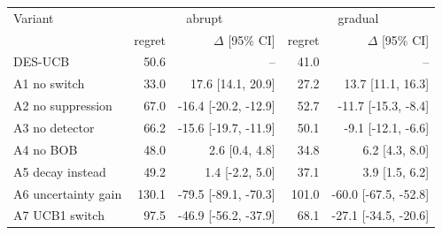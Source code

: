 \begin{tabular}{lrrrr}
\toprule
Variant & \multicolumn{2}{c}{abrupt} & \multicolumn{2}{c}{gradual} \\
 & regret & $\Delta$ [95\% CI] & regret & $\Delta$ [95\% CI] \\
\midrule
DES-UCB & 50.6 & -- & 41.0 & -- \\
A1 no switch & 33.0 & 17.6 [14.1, 20.9] & 27.2 & 13.7 [11.1, 16.3] \\
A2 no suppression & 67.0 & -16.4 [-20.2, -12.9] & 52.7 & -11.7 [-15.3, -8.4] \\
A3 no detector & 66.2 & -15.6 [-19.7, -11.9] & 50.1 & -9.1 [-12.1, -6.6] \\
A4 no BOB & 48.0 & 2.6 [0.4, 4.8] & 34.8 & 6.2 [4.3, 8.0] \\
A5 decay instead & 49.2 & 1.4 [-2.2, 5.0] & 37.1 & 3.9 [1.5, 6.2] \\
A6 uncertainty gain & 130.1 & -79.5 [-89.1, -70.3] & 101.0 & -60.0 [-67.5, -52.8] \\
A7 UCB1 switch & 97.5 & -46.9 [-56.2, -37.9] & 68.1 & -27.1 [-34.5, -20.6] \\
\bottomrule
\end{tabular}